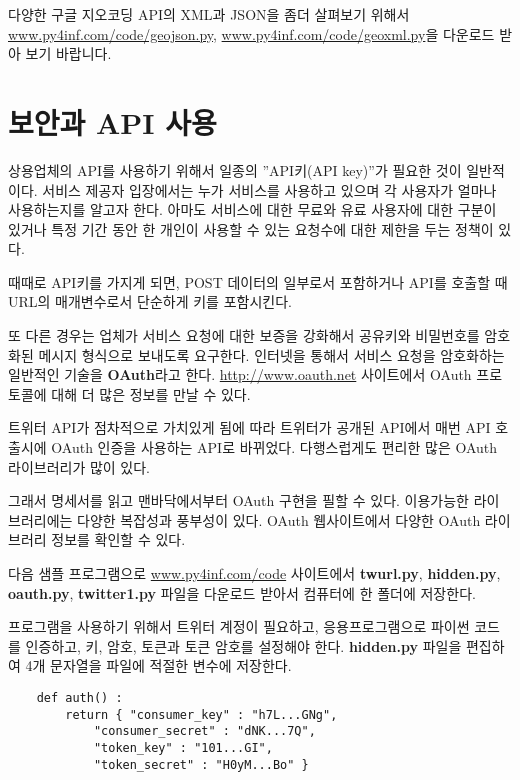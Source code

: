 다양한 구글 지오코딩 API의 XML과 JSON을 좀더 살펴보기 위해서 \url{www.py4inf.com/code/geojson.py},
\url{www.py4inf.com/code/geoxml.py}을 다운로드 받아 보기 바랍니다.

\section{보안과 API 사용}

상용업체의 API를 사용하기 위해서 일종의 ''API키(API key)''가 필요한 것이 일반적이다.
서비스 제공자 입장에서는 누가 서비스를 사용하고 있으며 각 사용자가 얼마나 사용하는지를 알고자 한다.
아마도 서비스에 대한 무료와 유료 사용자에 대한 구분이 있거나 특정 기간 동안 한 개인이 사용할 수 있는
요청수에 대한 제한을 두는 정책이 있다. 

때때로 API키를 가지게 되면, POST 데이터의 일부로서 포함하거나 API를 호출할 때
URL의 매개변수로서 단순하게 키를 포함시킨다.

또 다른 경우는 업체가 서비스 요청에 대한 보증을 강화해서 공유키와 비밀번호를 암호화된 메시지 형식으로
보내도록 요구한다. 인터넷을 통해서 서비스 요청을 암호화하는 일반적인 기술을 {\bf OAuth}라고 한다.
\url{http://www.oauth.net} 사이트에서 OAuth 프로토콜에 대해 더 많은 정보를 만날 수 있다. 

트위터 API가 점차적으로 가치있게 됨에 따라 트위터가 공개된 API에서 매번 API 호출시에 OAuth 인증을 사용하는
API로 바뀌었다. 다행스럽게도 편리한 많은 OAuth 라이브러리가 많이 있다. 

그래서 명세서를 읽고 맨바닥에서부터 OAuth 구현을 필할 수 있다. 이용가능한 라이브러리에는 
다양한 복잡성과 풍부성이 있다. OAuth 웹사이트에서 다양한 OAuth 라이브러리 정보를 확인할 수 있다. 

다음 샘플 프로그램으로 \url{www.py4inf.com/code} 사이트에서 {\bf twurl.py}, {\bf hidden.py}, 
{\bf oauth.py}, {\bf twitter1.py} 파일을 다운로드 받아서 컴퓨터에 한 폴더에 저장한다.

프로그램을 사용하기 위해서 트위터 계정이 필요하고, 응용프로그램으로 파이썬 코드를 인증하고,
키, 암호, 토큰과 토큰 암호를 설정해야 한다. 
{\bf hidden.py} 파일을 편집하여 4개 문자열을 파일에 적절한 변수에 저장한다.

\beforeverb
\begin{verbatim}
    def auth() :
        return { "consumer_key" : "h7L...GNg",
            "consumer_secret" : "dNK...7Q",
            "token_key" : "101...GI",
            "token_secret" : "H0yM...Bo" }
\end{verbatim}
\afterverb
%

